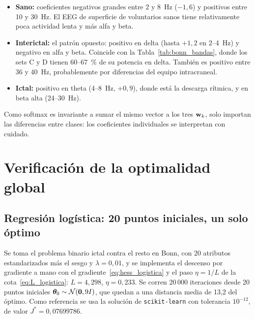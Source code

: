 \begin{itemize}
  \item \textbf{Sano:} coeficientes negativos grandes entre 2 y 8~Hz ($-1{,}6$) y positivos entre 10 y 30~Hz. El EEG de
        superficie de voluntarios sanos tiene relativamente poca actividad lenta y más alfa y beta.
  \item \textbf{Interictal:} el patrón opuesto: positivo en delta (hasta $+1{,}2$ en 2--4~Hz) y negativo en alfa y beta.
        Coincide con la Tabla~\ref{tab:bonn_bandas}, donde los sets C y D tienen 60--67~\% de su potencia en delta.
        También es positivo entre 36 y 40~Hz, probablemente por diferencias del equipo intracraneal.
  \item \textbf{Ictal:} positivo en theta (4--8~Hz, $+0{,}9$), donde está la descarga rítmica, y en beta alta (24--30~Hz).
\end{itemize}
Como softmax es invariante a sumar el mismo vector a los tres $\mathbf{w}_k$, solo importan las diferencias entre clases: los
coeficientes individuales se interpretan con cuidado.

\section{Verificación de la optimalidad global}
\label{sec:verif_optimalidad}

\subsection{Regresión logística: 20 puntos iniciales, un solo óptimo}

Se toma el problema binario ictal contra el resto en Bonn, con 20 atributos estandarizados más el sesgo y $\lambda = 0{,}01$,
y se implementa el descenso por gradiente a mano con el gradiente~\eqref{eq:hess_logistica} y el paso $\eta = 1/L$ de
la cota~\eqref{eq:L_logistica}: $L = 4{,}298$, $\eta = 0{,}233$. Se corren 20\,000 iteraciones desde 20 puntos
iniciales $\boldsymbol{\theta}_0 \sim \mathcal{N}(\mathbf{0}, 9I)$, que quedan a una distancia media de 13,2 del óptimo. Como
referencia se usa la solución de \texttt{scikit-learn} con tolerancia $10^{-12}$, de valor $J^* = 0{,}07699786$.


